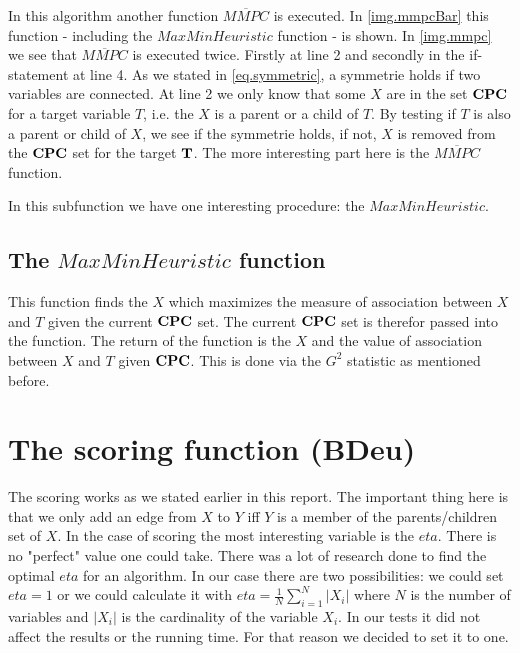 			 \label{img.mmpc}

			In this algorithm another function $\overline{MMPC}$ is executed. In \autoref{img.mmpcBar} this function - including the $MaxMinHeuristic$ function - is shown. In \autoref{img.mmpc} we see that $\overline{MMPC}$ is executed twice. Firstly at line 2 and secondly in the if-statement at line 4. As we stated in \autoref{eq.symmetric}, a symmetrie holds if two variables are connected. At line 2 we only know that some $X$ are in the set ${\textbf{CPC}}$ for a target variable $T$, i.e. the $X$ is a parent or a child of $T$. By testing if $T$ is also a parent or child of $X$, we see if the symmetrie holds, if not, $X$ is removed from the ${\textbf{CPC}}$ set for the target ${\textbf{T}}$. The more interesting part here is the $\overline{MMPC}$ function.

			 \label{img.mmpcBar}

			In this subfunction we have one interesting procedure: the $MaxMinHeuristic$.

			\subsection{The $MaxMinHeuristic$ function}

				This function finds the $X$ which maximizes the measure of association between $X$ and $T$ given the current ${\textbf{CPC}}$ set. The current ${\textbf{CPC}}$ set is therefor passed into the function. The return of the function is the $X$ and the value of association between $X$ and $T$ given ${\textbf{CPC}}$. This is done via the $G^{2}$ statistic as mentioned before.

		\section{The scoring function (BDeu)}

			The scoring works as we stated earlier in this report. The important thing here is that we only add an edge from $X$ to $Y$ iff $Y$ is a member of the parents/children set of $X$. In the case of scoring the most interesting variable is the $eta$. There is no "perfect" value one could take. There was a lot of research done to find the optimal $eta$ for an algorithm. In our case there are two possibilities: we could set $eta = 1$ or we could calculate it with $eta = \frac{1}{N} \sum_{i = 1}^{N} |X_{i}|$ where $N$ is the number of variables and $|X_{i}|$ is the cardinality of the variable $X_{i}$. In our tests it did not affect the results or the running time. For that reason we decided to set it to one.
			

